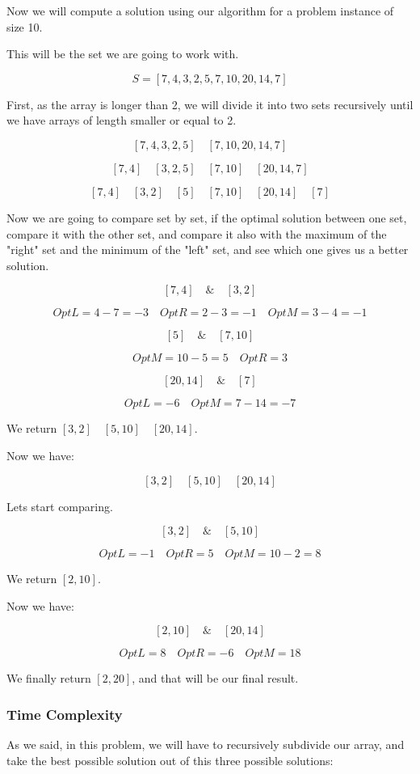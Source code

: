 \documentclass{article}
\begin{document}
Now we will compute a solution using our algorithm for a problem instance of size 10.

This will be the set we are going to work with.

$$S = [7,4,3,2,5,7,10,20,14,7]$$

First, as the array is longer than 2, we will divide it into two sets recursively until we have arrays of length smaller or equal to 2.

$$[7,4,3,2,5] \quad [7,10,20,14,7]$$

$$[7,4] \quad [3,2,5] \quad [7,10] \quad [20,14,7]$$

$$[7,4] \quad [3,2] \quad [5] \quad [7,10] \quad [20,14] \quad [7]$$

Now we are going to compare set by set, if the optimal solution between one set, compare it with the other set, and compare it also with the maximum of the "right" set and the minimum of the "left" set, and see which one gives us a better solution.

$$[7,4] \quad \& \quad [3,2]$$

$$OptL = 4-7 = -3 \quad OptR = 2-3 = -1 \quad OptM = 3-4 = -1$$

$$[5] \quad \& \quad [7,10]$$

$$OptM = 10-5 = 5 \quad OptR = 3$$

$$[20,14] \quad  \& \quad [7]$$

$$OptL = -6 \quad OptM = 7-14 = -7$$

We return $[3,2] \quad [5,10] \quad [20,14]$.

Now we have:

$$[3,2] \quad [5,10] \quad [20,14]$$

Lets start comparing.

$$[3,2] \quad \& \quad [5,10]$$

$$OptL = -1 \quad OptR = 5 \quad OptM = 10 - 2 = 8$$

We return $[2,10]$.

Now we have:

$$[2,10] \quad \& \quad [20,14]$$

$$OptL = 8 \quad OptR = -6 \quad OptM = 18$$

We finally return $[2,20]$, and that will be our final result.

\subsubsection*{Time Complexity}

As we said, in this problem, we will have to recursively subdivide our array, and take the best possible solution out of this three possible solutions:
\end{document}
